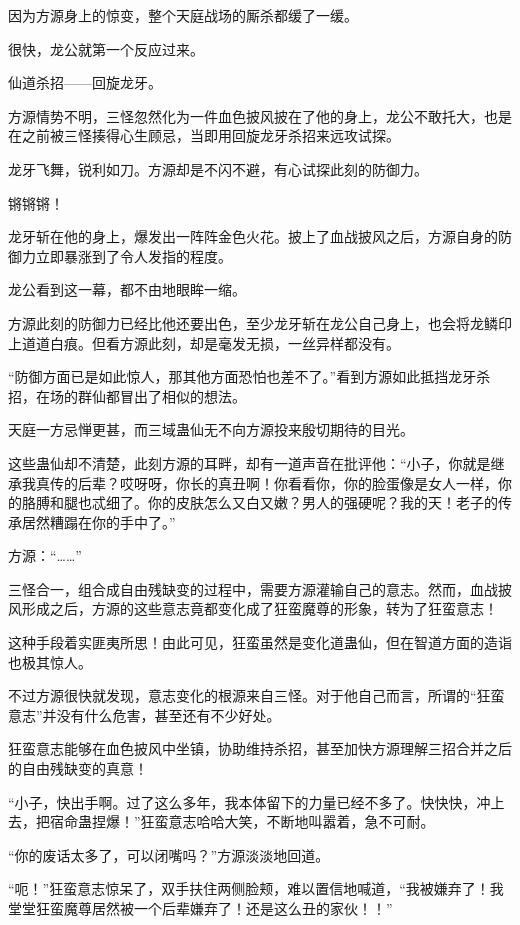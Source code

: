 
\begin{this_body}

因为方源身上的惊变，整个天庭战场的厮杀都缓了一缓。

很快，龙公就第一个反应过来。

仙道杀招——回旋龙牙。

方源情势不明，三怪忽然化为一件血色披风披在了他的身上，龙公不敢托大，也是在之前被三怪揍得心生顾忌，当即用回旋龙牙杀招来远攻试探。

龙牙飞舞，锐利如刀。方源却是不闪不避，有心试探此刻的防御力。

锵锵锵！

龙牙斩在他的身上，爆发出一阵阵金色火花。披上了血战披风之后，方源自身的防御力立即暴涨到了令人发指的程度。

龙公看到这一幕，都不由地眼眸一缩。

方源此刻的防御力已经比他还要出色，至少龙牙斩在龙公自己身上，也会将龙鳞印上道道白痕。但看方源此刻，却是毫发无损，一丝异样都没有。

“防御方面已是如此惊人，那其他方面恐怕也差不了。”看到方源如此抵挡龙牙杀招，在场的群仙都冒出了相似的想法。

天庭一方忌惮更甚，而三域蛊仙无不向方源投来殷切期待的目光。

这些蛊仙却不清楚，此刻方源的耳畔，却有一道声音在批评他：“小子，你就是继承我真传的后辈？哎呀呀，你长的真丑啊！你看看你，你的脸蛋像是女人一样，你的胳膊和腿也忒细了。你的皮肤怎么又白又嫩？男人的强硬呢？我的天！老子的传承居然糟蹋在你的手中了。”

方源：“……”

三怪合一，组合成自由残缺变的过程中，需要方源灌输自己的意志。然而，血战披风形成之后，方源的这些意志竟都变化成了狂蛮魔尊的形象，转为了狂蛮意志！

这种手段着实匪夷所思！由此可见，狂蛮虽然是变化道蛊仙，但在智道方面的造诣也极其惊人。

不过方源很快就发现，意志变化的根源来自三怪。对于他自己而言，所谓的“狂蛮意志”并没有什么危害，甚至还有不少好处。

狂蛮意志能够在血色披风中坐镇，协助维持杀招，甚至加快方源理解三招合并之后的自由残缺变的真意！

“小子，快出手啊。过了这么多年，我本体留下的力量已经不多了。快快快，冲上去，把宿命蛊捏爆！”狂蛮意志哈哈大笑，不断地叫嚣着，急不可耐。

“你的废话太多了，可以闭嘴吗？”方源淡淡地回道。

“呃！”狂蛮意志惊呆了，双手扶住两侧脸颊，难以置信地喊道，“我被嫌弃了！我堂堂狂蛮魔尊居然被一个后辈嫌弃了！还是这么丑的家伙！！”


\end{this_body}

